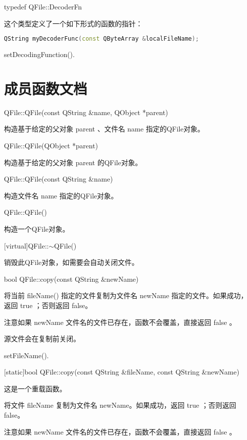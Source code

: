 typedef QFile::DecoderFn

这个类型定义了一个如下形式的函数的指针：


\begin{lstlisting}[language=C++]
QString myDecoderFunc(const QByteArray &localFileName);
\end{lstlisting}


\begin{notice}[另请参阅]
setDecodingFunction().
\end{notice} 

\splitLine

\section{成员函数文档}

QFile::QFile(const QString \&name, QObject *parent)

构造基于给定的父对象 parent 、文件名 name 指定的QFile对象。

QFile::QFile(QObject *parent)

构造基于给定的父对象 parent 的QFile对象。

QFile::QFile(const QString \&name)

构造文件名 name 指定的QFile对象。

QFile::QFile()

构造一个QFile对象。

[virtual]QFile::$\sim$QFile()

销毁此QFile对象，如需要会自动关闭文件。

bool QFile::copy(const QString \&newName)

将当前 fileName() 指定的文件复制为文件名 newName 指定的文件。如果成功，返回 true ；否则返回 false。

注意如果 newName 文件名的文件已存在，函数不会覆盖，直接返回 false 。

源文件会在复制前关闭。



\begin{notice}[另请参阅]
setFileName().
\end{notice} 

[static]bool QFile::copy(const QString \&fileName, const QString \&newName)

这是一个重载函数。

将文件 fileName 复制为文件名 newName。如果成功，返回 true ；否则返回 false。

注意如果 newName 文件名的文件已存在，函数不会覆盖，直接返回 false 。



